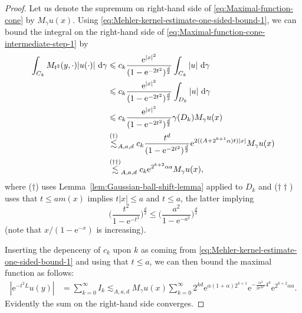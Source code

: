 \documentclass{amsart}
\theoremstyle{remark}
\newcommand{\D}{\,\textup{d}}
\renewcommand{\leq}{\leqslant}
\renewcommand{\leq}{\leqslant}
\newcommand{\e}{\mathrm{e}} %
\renewcommand{\leq}{\leqslant}%
\begin{document}
\begin{proof}
  Let us denote the supremum on right-hand side of \eqref{eq:Maximal-function-cone} by $M_\gamma u (x)$.
  Using \eqref{eq:Mehler-kernel-estimate-one-sided-bound-1}, we can bound the
  integral on the right-hand side of
  \eqref{eq:Maximal-function-cone-intermediate-step-1} by
  \begin{align*}
    \int_{C_k}  M_{t^2}(y, \cdot) |u(\cdot)| \,\D\gamma & \leq
    c_k \frac{\e^{|x|^2}}{(1 - \e^{-2t^2})^{\frac{d}2}}   \int_{C_k}
    |u| \,\D\gamma\\ 
    &\leq c_k \frac {\e^{|x|^2}} {(1 -
      \e^{-2t^2})^{\frac{d}2}} \int_{D_k} |u| \,\D\gamma\\ 
    &\leq c_k  \frac {\e^{|x|^2}}{(1 - \e^{-2t^2})^{\frac{d}2}}  \gamma(D_k) M_\gamma u(x)\\
    &\overset{(\dagger)}{\lesssim}_{A,a,d} c_k 
    \frac {t^d}{(1 - \e^{-2t^2})^{\frac{d}2}} \e^{2((A +2^{k + 1}\alpha)t)|x|} M_\gamma u(x)\\
    &\overset{(\dagger\dagger)}{\lesssim}_{A,a,d} c_k \e^{2^{k + 2}\alpha a} M_\gamma u(x),
  \end{align*}
  where ($\dagger$) uses Lemma~\ref{lem:Gaussian-ball-shift-lemma} applied to
  $D_k$ and ($\dagger\dagger$) uses that $t \leq am(x)$ implies $t|x|\leq a$
  and $t\leq a$, the latter implying
  \begin{equation*}
    \biggl(\frac{t^2}{1 -
      \e^{-t^2}} \biggr)^{\frac{d}2} \leq
    \biggl(\frac{a^2}{1 -
      \e^{-a^2}} \biggr)^{\frac{d}2}
  \end{equation*}
  (note that $x/(1-\e^{-x})$ is increasing).

  Inserting the depenceny of $c_k$ upon $k$ as coming from 
  \eqref{eq:Mehler-kernel-estimate-one-sided-bound-1} and using that $t\leq a$, 
  we can then bound the maximal function as follows: 
  \begin{align*}
    |\e^{-t^2 L} u(y)| &= \sum_{k = 0}^\infty I_k
    \lesssim_{A,a,d} M_\gamma u(x) \sum_{k = 0}^\infty 2^{kd} \e^{\alpha(1+\alpha) 2^{k + 1}} 
    \e^{-\frac{\alpha^2}{2 \e^{2a^2}}  4^k} \e^{ 2^{k + 2} \alpha a}.
  \end{align*}
  Evidently the sum on the right-hand side converges.
\end{proof}


\end{document}
